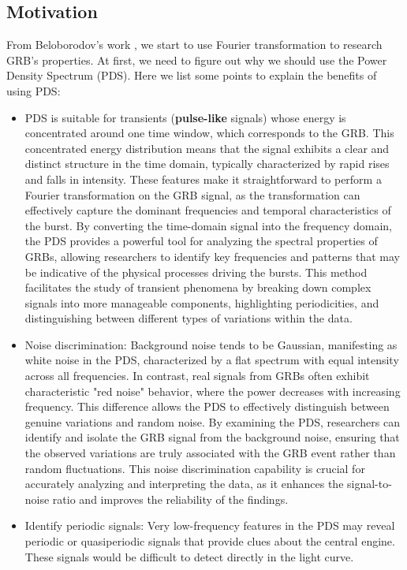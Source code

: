 \documentclass[prd,10pt]{revtex4-2}
\begin{document}
\subsection{Motivation}

From Beloborodov's work \cite{Beloborodov:1998ai}, we start to use Fourier transformation to research GRB's properties. At first, we need to figure out why we should use the Power Density Spectrum (PDS). Here we list some points to explain the benefits of using PDS:

\begin{itemize}
    \item PDS is suitable for transients (\textbf{pulse-like} signals) whose energy is concentrated around one time window, which corresponds to the GRB. This concentrated energy distribution means that the signal exhibits a clear and distinct structure in the time domain, typically characterized by rapid rises and falls in intensity. These features make it straightforward to perform a Fourier transformation on the GRB signal, as the transformation can effectively capture the dominant frequencies and temporal characteristics of the burst. By converting the time-domain signal into the frequency domain, the PDS provides a powerful tool for analyzing the spectral properties of GRBs, allowing researchers to identify key frequencies and patterns that may be indicative of the physical processes driving the bursts. This method facilitates the study of transient phenomena by breaking down complex signals into more manageable components, highlighting periodicities, and distinguishing between different types of variations within the data.
    \item Noise discrimination: Background noise tends to be Gaussian, manifesting as white noise in the PDS, characterized by a flat spectrum with equal intensity across all frequencies. In contrast, real signals from GRBs often exhibit characteristic "red noise" behavior, where the power decreases with increasing frequency. This difference allows the PDS to effectively distinguish between genuine variations and random noise. By examining the PDS, researchers can identify and isolate the GRB signal from the background noise, ensuring that the observed variations are truly associated with the GRB event rather than random fluctuations. This noise discrimination capability is crucial for accurately analyzing and interpreting the data, as it enhances the signal-to-noise ratio and improves the reliability of the findings.
    \item Identify periodic signals: Very low-frequency features in the PDS may reveal periodic or quasiperiodic signals that provide clues about the central engine. These signals would be difficult to detect directly in the light curve.
\end{itemize}
\end{document}
